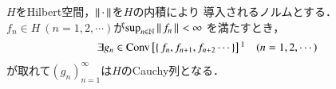 \begin{itembox}[l]{}
	\begin{thm}[Kolmosの補題]
		$H$をHilbert空間，$\left\|\, \cdot\, \right\|_{}$を$H$の内積により
		導入されるノルムとする．$f_n \in H\ (n=1,2,\cdots)$が$\operatorname*{sup}_{n \in \mathbb{N}} \left\|\, f_n\, \right\|_{} < \infty$
		を満たすとき，
		\begin{align}
			\exists g_n \in \Conv{f_n,f_{n+1},f_{n+2} \cdots}\footnotemark \quad (n=1,2,\cdots)
		\end{align}
		が取れて$(g_n)_{n=1}^{\infty}$は$H$のCauchy列となる．
	\end{thm}
\end{itembox}


